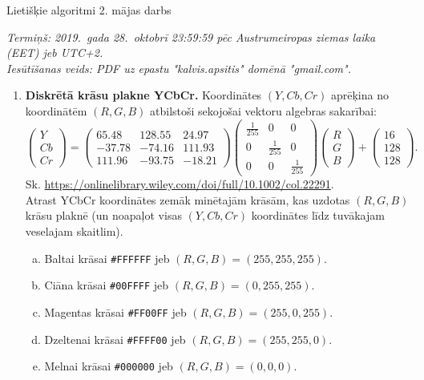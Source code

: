 \documentclass[11pt]{article}
\begin{document}
\thispagestyle{empty}

{\Large Lietišķie algoritmi \textendash{} 2. mājas darbs}

\noindent
{\em Termiņš: 2019.\ gada 28.\ oktobrī 23:59:59 pēc Austrumeiropas ziemas laika (EET) jeb UTC+2.}\\
{\em Iesūtīšanas veids: PDF uz epastu "kalvis.apsitis" domēnā "gmail.com".}


\begin{enumerate}
\item {\bf Diskrētā krāsu plakne YCbCr.} 
Koordinātes $(Y,Cb,Cr)$ aprēķina no koordinātēm $(R,G,B)$ atbilstoši 
sekojošai vektoru algebras sakarībai:
$$\left( \begin{array}{c}
Y\\
Cb\\
Cr
\end{array} \right) = \left( \begin{array}{ccc}
65.48 & 128.55 & 24.97\\
-37.78 & -74.16 & 111.93\\
111.96 & -93.75 & -18.21
\end{array} \right) \left( \begin{array}{ccc}
\frac{1}{255} & 0 & 0\\
0 & \frac{1}{255} & 0\\
0 & 0 & \frac{1}{255}
\end{array} \right) 
\left( \begin{array}{c}
R\\
G\\
B
\end{array} \right) + \left( \begin{array}{c}
16\\
128\\
128
\end{array} \right).$$
Sk. \url{https://onlinelibrary.wiley.com/doi/full/10.1002/col.22291}.\\
Atrast YCbCr koordinātes zemāk minētajām krāsām, kas uzdotas $(R,G,B)$ krāsu plaknē
(un noapaļot visas $(Y,Cb,Cr)$ koordinātes līdz tuvākajam veselajam skaitlim). 
\begin{enumerate}[(a)]
\item Baltai krāsai {\tt \#FFFFFF} jeb $(R,G,B) = (255,255,255)$. 
\item Ciāna krāsai  {\tt \#00FFFF} jeb $(R,G,B) = (0,255,255)$.
\item Magentas krāsai {\tt \#FF00FF} jeb $(R,G,B) = (255,0,255)$. 
\item Dzeltenai krāsai {\tt \#FFFF00} jeb $(R,G,B) = (255,255,0)$. 
\item Melnai krāsai  {\tt \#000000} jeb $(R,G,B) = (0,0,0)$.
\end{enumerate}


\end{enumerate}
\end{document}
